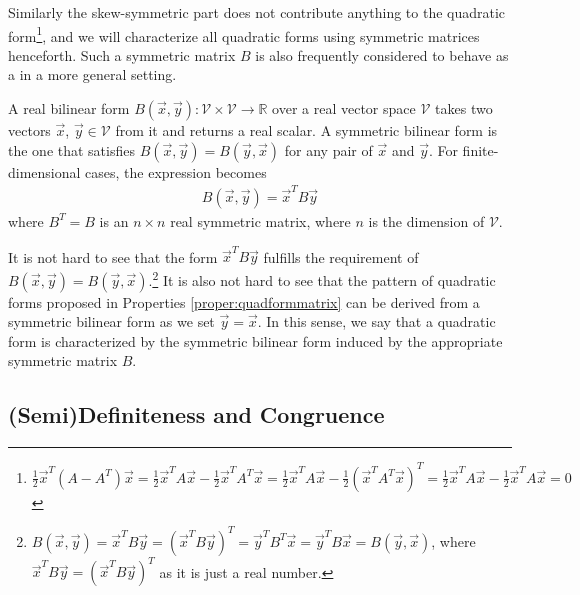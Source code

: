 Similarly the skew-symmetric part does not contribute anything to the quadratic form\footnote{$\frac{1}{2}\vec{x}^T(A - A^T)\vec{x} = \frac{1}{2}\vec{x}^TA\vec{x} - \frac{1}{2}\vec{x}^TA^T\vec{x} = \frac{1}{2}\vec{x}^TA\vec{x} - \frac{1}{2}(\vec{x}^TA^T\vec{x})^T = \frac{1}{2}\vec{x}^TA\vec{x} - \frac{1}{2}\vec{x}^TA\vec{x} = 0$}, and we will characterize all quadratic forms using symmetric matrices henceforth.
Such a symmetric matrix $B$ is also frequently considered to behave as a  in a more general setting.
\begin{defn}
A real bilinear form $B(\vec{x}, \vec{y}): \mathcal{V} \times \mathcal{V} \to \mathbb{R}$ over a real vector space $\mathcal{V}$ takes two vectors $\vec{x}$, $\vec{y} \in \mathcal{V}$ from it and returns a real scalar. A symmetric bilinear form is the one that satisfies $B(\vec{x}, \vec{y}) = B(\vec{y}, \vec{x})$ for any pair of $\vec{x}$ and $\vec{y}$. For finite-dimensional cases, the expression becomes
\begin{align*}
B(\vec{x}, \vec{y}) = \vec{x}^T B \vec{y}    
\end{align*}
where $B^T = B$ is an $n \times n$ real symmetric matrix, where $n$ is the dimension of $\mathcal{V}$.
\end{defn}
It is not hard to see that the form $\vec{x}^TB\vec{y}$ fulfills the requirement of $B(\vec{x}, \vec{y}) = B(\vec{y}, \vec{x})$.\footnote{$B(\vec{x}, \vec{y}) = \vec{x}^TB\vec{y} = (\vec{x}^TB\vec{y})^T = \vec{y}^TB^T\vec{x} = \vec{y}^TB\vec{x} = B(\vec{y}, \vec{x})$, where $\vec{x}^TB\vec{y} = (\vec{x}^TB\vec{y})^T$ as it is just a real number.} It is also not hard to see that the pattern of quadratic forms proposed in Properties \ref{proper:quadformmatrix} can be derived from a symmetric bilinear form as we set $\vec{y} = \vec{x}$. In this sense, we say that a quadratic form is characterized by the symmetric bilinear form induced by the appropriate symmetric matrix $B$.

\subsection{(Semi)Definiteness and Congruence}
\label{subsection:definiteness}

